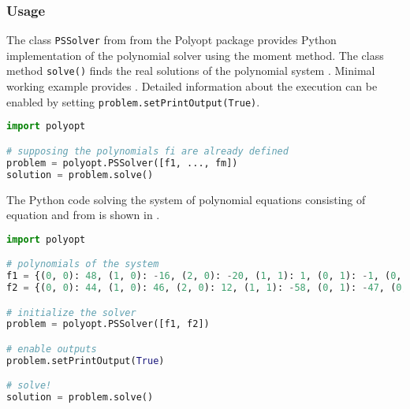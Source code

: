 \subsubsection{Usage}
The class \texttt{PSSolver} from from the Polyopt package provides Python implementation of the polynomial solver using the moment method.
The class method \texttt{solve()} finds the real solutions of the polynomial system .
Minimal working example provides .
Detailed information about the execution can be enabled by setting \texttt{problem.setPrintOutput(True)}.

\begin{lstlisting}[language=python, caption={Typical usage of the class \texttt{PSSolver} of the Polyopt package.}, labellis={POP:sol:usage}]
import polyopt

# supposing the polynomials fi are already defined
problem = polyopt.PSSolver([f1, ..., fm])
solution = problem.solve()
\end{lstlisting}

\begin{example}
The Python code solving the system of polynomial equations consisting of equation  and  from  is shown in .

  \begin{lstlisting}[language=python, caption={Code for solving system of polynomial equations stated in \refex{POP:sol:example}}, labellis={POP:sol:example}]
import polyopt

# polynomials of the system
f1 = {(0, 0): 48, (1, 0): -16, (2, 0): -20, (1, 1): 1, (0, 1): -1, (0, 2): -12}
f2 = {(0, 0): 44, (1, 0): 46, (2, 0): 12, (1, 1): -58, (0, 1): -47, (0, 2): 3}

# initialize the solver
problem = polyopt.PSSolver([f1, f2])

# enable outputs
problem.setPrintOutput(True)

# solve!
solution = problem.solve()

  \end{lstlisting}

\end{example}

